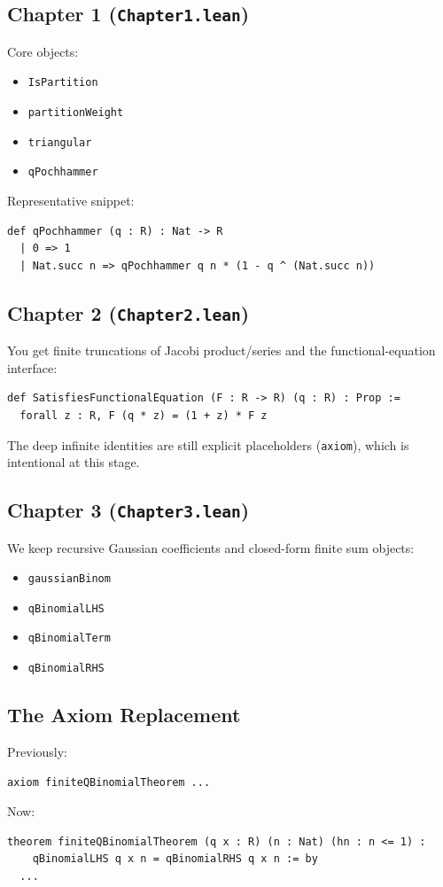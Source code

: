 \documentclass[11pt]{article}
\begin{document}
\subsection*{Chapter 1 (\texttt{Chapter1.lean})}
Core objects:
\begin{itemize}[leftmargin=1.2em]
  \item \texttt{IsPartition}
  \item \texttt{partitionWeight}
  \item \texttt{triangular}
  \item \texttt{qPochhammer}
\end{itemize}

Representative snippet:
\begin{lstlisting}
def qPochhammer (q : R) : Nat -> R
  | 0 => 1
  | Nat.succ n => qPochhammer q n * (1 - q ^ (Nat.succ n))
\end{lstlisting}

\subsection*{Chapter 2 (\texttt{Chapter2.lean})}
You get finite truncations of Jacobi product/series and the functional-equation interface:
\begin{lstlisting}
def SatisfiesFunctionalEquation (F : R -> R) (q : R) : Prop :=
  forall z : R, F (q * z) = (1 + z) * F z
\end{lstlisting}

The deep infinite identities are still explicit placeholders (\texttt{axiom}), which is intentional at this stage.

\subsection*{Chapter 3 (\texttt{Chapter3.lean})}
We keep recursive Gaussian coefficients and closed-form finite sum objects:
\begin{itemize}[leftmargin=1.2em]
  \item \texttt{gaussianBinom}
  \item \texttt{qBinomialLHS}
  \item \texttt{qBinomialTerm}
  \item \texttt{qBinomialRHS}
\end{itemize}

\subsection*{The Axiom Replacement}
Previously:
\begin{lstlisting}
axiom finiteQBinomialTheorem ...
\end{lstlisting}
Now:
\begin{lstlisting}
theorem finiteQBinomialTheorem (q x : R) (n : Nat) (hn : n <= 1) :
    qBinomialLHS q x n = qBinomialRHS q x n := by
  ...
\end{lstlisting}
\end{document}
